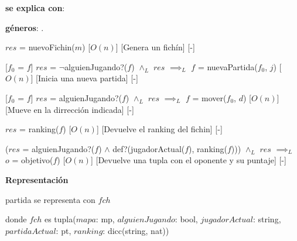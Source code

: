 \documentclass{book}
\begin{document}
    \begin{Interfaz}

        \textbf{se explica con}: 

        \textbf{géneros}: .


        {$res$ = nuevoFichin($m$)}%
        [$O(n)$]
        [Genera un fichín]
        [-]

        [$f_0$ = $f$]
        {$res$ = $\neg$alguienJugando?($f$) $\wedge_L$ $res$ $\implies_L$ $f$ = nuevaPartida($f_0$, $j$) }%
        [$O(n)$]
        [Inicia una nueva partida]
        [-]

        [$f_0$ = $f$]
        {$res$ = alguienJugando?($f$) $\wedge_L$ $res$ $\implies_L$ $f$ = mover($f_0$, $d$) }%
        [$O(n)$]
        [Mueve en la dirrección indicada]
        [-]

        {$res$ = ranking($f$)}%
        [$O(n)$]
        [Devuelve el ranking del fichin]
        [-]

        {($res$ = alguienJugando?($f$) $\wedge$ def?(jugadorActual($f$), ranking($f$))) $\wedge_L$ $res$ $\implies_L$ $o$ = objetivo($f$) }%
        [$O(n)$]
        [Devuelve una tupla con el oponente y su puntaje]
        [-]

    \end{Interfaz}

    \textbf{Representación}

    partida se representa con $fch$

    donde $fch$ es tupla($mapa$: mp, $alguienJugando$: bool, $jugadorActual$: string, $partidaActual$: pt, $ranking$: dicc(string, nat))
\end{document}
